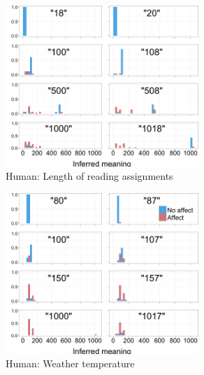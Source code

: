 \documentclass{article} %
\begin{document}
\begin{figure}[b]
	\centering
	\includegraphics[width=0.65\textwidth]{humans_reading_all.png}
	\caption{Human: Length of reading assignments}
\end{figure}

\begin{figure}[h]
	\centering
	\includegraphics[width=0.65\textwidth]{humans_weather_all.png}
	\caption{Human: Weather temperature}
\end{figure}
\end{document}
